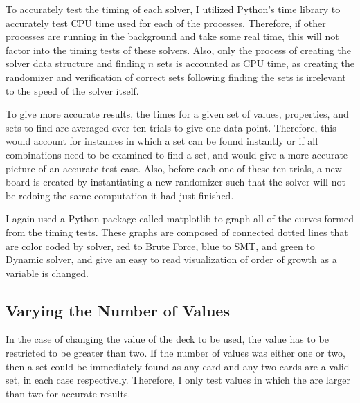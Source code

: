 \documentclass[pageno]{jpaper}
\begin{document}
To accurately test the timing of each solver, I utilized Python's time library to accurately test CPU time used for each of the processes. Therefore, if other processes are running in the background and take some real time, this will not factor into the timing tests of these solvers. Also, only the process of creating the solver data structure and finding $n$ sets is accounted as CPU time, as creating the randomizer and verification of correct sets following finding the sets is irrelevant to the speed of the solver itself. 

To give more accurate results, the times for a given set of values, properties, and sets to find are averaged over ten trials to give one data point. Therefore, this would account for instances in which a set can be found instantly or if all combinations need to be examined to find a set, and would give a more accurate picture of an accurate test case. Also, before each one of these ten trials, a new board is created by instantiating a new randomizer such that the solver will not be redoing the same computation it had just finished. 

I again used a Python package called matplotlib to graph all of the curves formed from the timing tests. These graphs are composed of connected dotted lines that are color coded by solver, red to Brute Force, blue to SMT, and green to Dynamic solver, and give an easy to read visualization of order of growth as a variable is changed. 



\subsection{Varying the Number of Values}

In the case of changing the value of the deck to be used, the value has to be restricted to be greater than two. If the number of values was either one or two, then a set could be immediately found as any card and any two cards are a valid set, in each case respectively. Therefore, I only test values in which the are larger than two for accurate results. 
\end{document}

